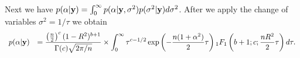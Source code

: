 \documentclass{article}[12pt]
\newcommand{\joc}[1]{{\color{red}#1}}
\begin{document}
 
Next we have
$p(\alpha|{\bf y}) = \int_0^\infty p(\alpha|{\bf y},\sigma^2)p(\sigma^2|{\bf y}) d\sigma^2$.
After we apply the change of variables $\sigma^2 = 1/\tau$
we obtain
$$
\begin{array}{rl}
\displaystyle p(\alpha|{\bf y}) 
& \displaystyle = \frac{\left(\tfrac{n}{2}\right)^c (1 -  R^2)^{b+1}  }{\Gamma(c)\sqrt{2\pi/n}} 
\times 
\int_0^\infty 
\tau^{c - 1/2} \exp\left( -\frac{n(1+\alpha^2)}{2} \tau \right)   {}_1 F_1\left( b + 1; c; \frac{nR^2}{2} \tau \right) d \tau.
\end{array}
$$







%
%
\end{document}
